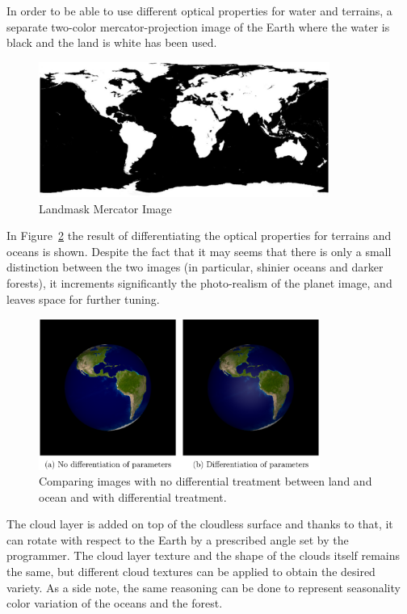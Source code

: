 In order to be able to use different optical properties for water and terrains, a separate two-color mercator-projection image of the Earth where the water is black and the land is white has been used.

\begin{figure}[htbp]
  \centering
  \includegraphics[width=0.85\textwidth]{gfx/landmask_mercator.eps}
  \caption{Landmask Mercator Image}
  \label{fig:LandmaskMercator}
\end{figure}

In Figure~\ref{fig:comparisonEarths} the result of differentiating the optical properties for terrains and oceans is shown. Despite the fact that it may seems that there is only a small distinction between the two images (in particular, shinier oceans and darker forests), it increments significantly the photo-realism of the planet image, and leaves space for further tuning.

\begin{figure}[htbp]
  \centering
  \includegraphics[width=0.82\textwidth]{gfx/comparisonEarths.eps}
  \caption{Comparing images with no differential treatment between land and ocean and with differential treatment.}
  \label{fig:comparisonEarths}
\end{figure}

The cloud layer is added on top of the cloudless surface and thanks to that, it can rotate with respect to the Earth by a prescribed angle set by the programmer. The cloud layer texture and the shape of the clouds itself remains the same, but different cloud textures can be applied to obtain the desired variety. As a side note, the same reasoning can be done to represent seasonality color variation of the oceans and the forest.


